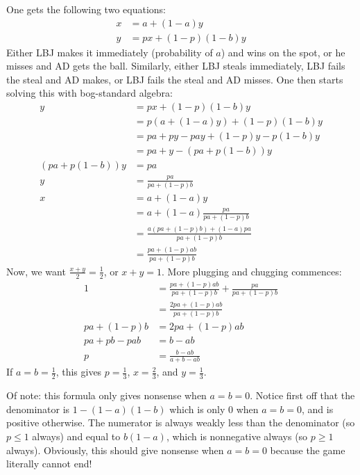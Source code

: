 \documentclass[11pt]{article}
\theoremstyle{definition}
\begin{document}
One gets the following two equations:
\begin{align*}
x & =  a + (1-a)y \\
y & = px + (1-p)(1-b)y 
\end{align*}
Either LBJ makes it immediately (probability of $a$) and wins on the spot, or he misses and AD gets the ball.  Similarly, either LBJ steals immediately, LBJ fails the steal and AD makes, or LBJ fails the steal and AD misses.  One then starts solving this with bog-standard algebra:
\begin{align*}
y &  = px + (1-p)(1-b)y \\
& = p(a + (1-a)y) + (1-p)(1-b)y \\
& = pa + py - pay + (1-p)y - p(1-b)y \\
& = pa + y - (pa+p(1-b))y \\
(pa+p(1-b))y & = pa \\
y & = \frac{pa}{pa+(1-p)b} \\
x &= a + (1-a)y \\
& = a + (1-a)\frac{pa}{pa+(1-p)b} \\
& = \frac{a(pa+(1-p)b) + (1-a)pa}{pa+(1-p)b} \\
& = \frac{pa+ (1-p)ab}{pa+(1-p)b}
\end{align*}
Now, we want $\frac{x+y}{2} = \frac{1}{2}$, or $x+y = 1$.  More plugging and chugging commences:
\begin{align*}
1 & =   \frac{pa+ (1-p)ab}{pa+(1-p)b} + \frac{pa}{pa+(1-p)b}\\
& =  \frac{2pa+ (1-p)ab}{pa+(1-p)b} \\
pa + (1-p)b & = 2pa + (1-p)ab \\
pa+pb-pab & = b-ab \\
p& = \frac{b-ab}{a+b-ab}
\end{align*}
If $a = b = \frac{1}{2}$, this gives $p = \frac{1}{3}$, $x = \frac{2}{3}$, and $y = \frac{1}{3}$.

Of note: this formula only gives nonsense when $a = b = 0$.  Notice first off that the denominator is $1-(1-a)(1-b)$ which is only $0$ when $a = b = 0$, and is positive otherwise.  The numerator is always weakly less than the denominator (so $p \leq 1$ always) and equal to $b(1-a)$, which is nonnegative always (so $p \geq 1$ always).  Obviously, this should give nonsense when $a=b=0$ because the game literally cannot end!
\end{document}
